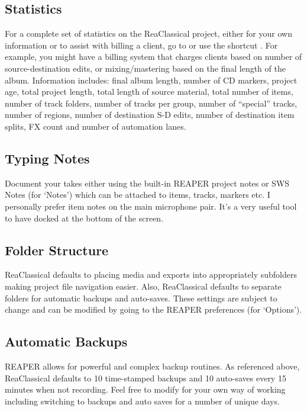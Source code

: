 \documentclass[10pt,american]{article}
\begin{document}
\subsection{Statistics}

For a complete set of statistics on the ReaClassical project, either for your
own information or to assist with billing a client, go to  or use the shortcut . For example, you might have a billing system that
charges clients based on number of source-destination edits, or mixing/mastering
based on the final length of the album. Information includes: final album
length, number of CD markers, project age, total project length, total length of
source material, total number of items, number of track folders, number of
tracks per group, number of ``special'' tracks, number of regions, number of
destination S-D edits, number of destination item splits, FX count and number of
automation lanes.

\subsection{Typing Notes}

Document your takes either using the built-in REAPER project notes or SWS Notes
 (for `Notes') which can be attached to items, tracks, markers etc. I
personally prefer item notes on the main microphone pair. It's a very useful
tool to have docked at the bottom of the screen.

\subsection{Folder Structure}

ReaClassical defaults to placing media and exports into appropriately subfolders
making project file navigation easier. Also, ReaClassical defaults to separate
folders for automatic backups and auto-saves. These settings are subject to
change and can be modified by going to the REAPER preferences  (for
`Options').

\subsection{Automatic Backups}

REAPER allows for powerful and complex backup routines. As referenced above,
ReaClassical defaults to 10 time-stamped backups and 10 auto-saves every 15
minutes when not recording. Feel free to modify for your own way of working
including switching to backups and auto saves for a number of unique days.
\end{document}
